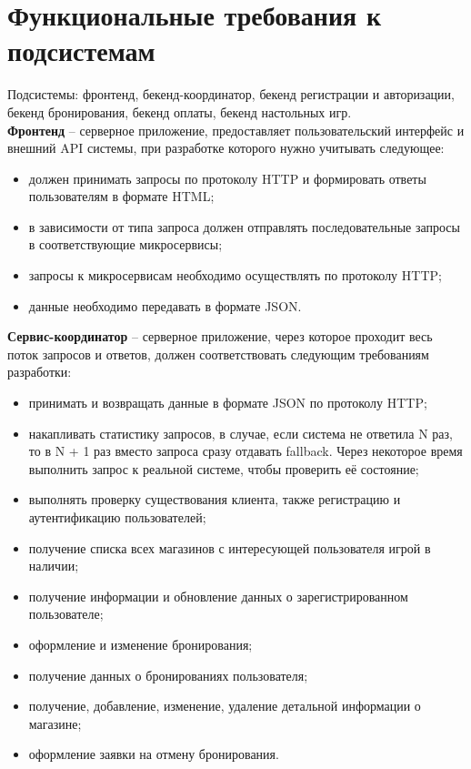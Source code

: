 \section*{Функциональные требования к подсистемам}
Подсистемы: фронтенд, бекенд-координатор, бекенд регистрации и авторизации, бекенд бронирования, бекенд оплаты, бекенд настольных игр.\\
\textbf{Фронтенд} -- серверное  приложение, предоставляет пользовательский интерфейс и внешний API системы, при  разработке которого нужно учитывать следующее:
\begin{itemize}
	\item должен  принимать  запросы  по  протоколу  HTTP и формировать ответы пользователям в формате HTML;
	
	\item в зависимости от типа запроса должен отправлять последовательные запросы в соответствующие микросервисы;
	
	\item запросы к микросервисам необходимо осуществлять по протоколу HTTP;
	
	\item данные необходимо передавать в формате JSON.
\end{itemize}
\textbf{Сервис-координатор} -- серверное приложение, через которое проходит весь поток запросов и ответов, должен соответствовать следующим требованиям разработки:
\begin{itemize}
	\item принимать и возвращать данные в формате JSON по протоколу HTTP;
	
	\item накапливать статистику запросов, в случае, если система не ответила N раз, то в N + 1 раз вместо запроса сразу отдавать fallback. Через некоторое время выполнить запрос к реальной системе, чтобы проверить её состояние;
	
	\item выполнять проверку существования клиента, также регистрацию и аутентификацию пользователей;
	
	\item получение списка всех магазинов с интересующей пользователя игрой в наличии;
	
	\item получение информации и обновление данных о зарегистрированном пользователе;
	
	\item оформление и изменение бронирования;
		
	\item получение данных о бронированиях пользователя;
    
    \item получение, добавление, изменение, удаление детальной информации о магазине;
    
    \item оформление заявки на отмену бронирования.
\end{itemize}
